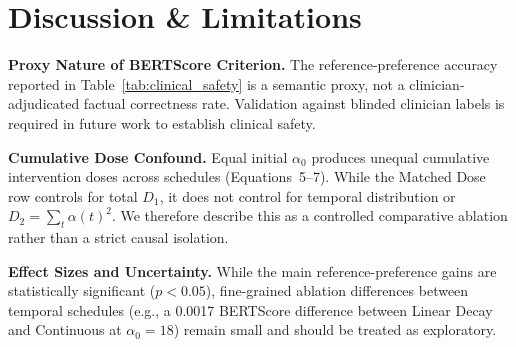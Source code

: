 \section{Discussion \& Limitations}

\textbf{Proxy Nature of BERTScore Criterion.} The reference-preference accuracy reported in Table~\ref{tab:clinical_safety} is a semantic proxy, not a clinician-adjudicated factual correctness rate. Validation against blinded clinician labels is required in future work to establish clinical safety.

\textbf{Cumulative Dose Confound.} Equal initial $\alpha_0$ produces unequal cumulative intervention doses across schedules (Equations~5--7). While the Matched Dose row controls for total $D_1$, it does not control for temporal distribution or $D_2 = \sum_t \alpha(t)^2$. We therefore describe this as a controlled comparative ablation rather than a strict causal isolation.

\textbf{Effect Sizes and Uncertainty.} While the main reference-preference gains are statistically significant ($p < 0.05$), fine-grained ablation differences between temporal schedules (e.g., a 0.0017 BERTScore difference between Linear Decay and Continuous at $\alpha_0=18$) remain small and should be treated as exploratory.

